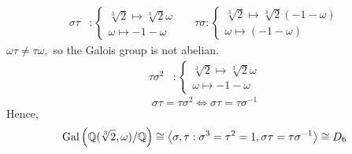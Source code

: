 \begin{example}
    \begin{align*}
        \sigma \tau &: \begin{cases*}
            \sqrt[3]{2} \mapsto \sqrt[3]{2} \omega \\
            \omega \mapsto -1-\omega
        \end{cases*} &&
        \tau \sigma: \begin{cases*}
            \sqrt[3]{2} \mapsto \sqrt[3]{2}(-1-\omega) \\
            \omega \mapsto (-1-\omega)
        \end{cases*}
    \end{align*}
    $\omega \tau \neq \tau \omega,$ so the Galois group is not abelian.
    \begin{align*}
        \tau\sigma^2 &: \begin{cases*}
            \sqrt[3]{2} \mapsto \sqrt[3]{2}\omega \\
            \omega \mapsto -1-\omega
        \end{cases*}
    \end{align*}
    $$\sigma\tau = \tau \sigma^2 \iff \sigma \tau = \tau \sigma^{-1}$$
    Hence,
    $$\text{Gal}\left(\mathbb{Q}(\sqrt[3]{2}, \omega)/\mathbb{Q}\right) \cong \left\langle \sigma, \tau : \sigma^3 = \tau^2 = 1, \sigma \tau = \tau \sigma^{-1} \right\rangle \cong D_6$$
\end{example}

